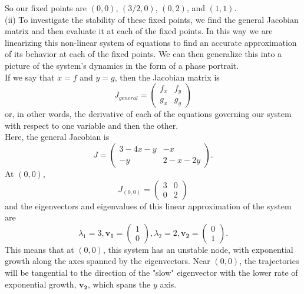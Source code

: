 \documentclass[11pt,answers]{exam}
\begin{document}
\begin{questions}
\begin{solution}
So our fixed points are $(0,0)$, $(3/2, 0)$, $(0,2)$, and $(1,1)$. \\
(ii) To investigate the stability of these fixed points, we find the general Jacobian matrix and then evaluate it at each of the fixed points. In this way we are linearizing this non-linear system of equations to find an accurate approximation of its behavior at each of the fixed points. We can then generalize this into a picture of the system's dynamics in the form of a phase portrait. \\
If we say that $\dot{x} = f$ and $\dot{y} = g$, then the Jacobian matrix is 
\begin{equation} J_{general} =
\begin{pmatrix}
f_{x} & f_{y}\\ 
g_{x} & g_{g}
\end{pmatrix}
\end{equation}
or, in other words, the derivative of each of the equations governing our system with respect to one variable and then the other. \\ 
Here, the general Jacobian is 
\begin{equation}J = 
\begin{pmatrix}
3-4x-y & -x\\ 
-y & 2-x-2y
\end{pmatrix}.
\end{equation}
At $(0,0)$,  
\begin{equation}J_{(0,0)} = 
\begin{pmatrix}
3 & 0\\ 
0 & 2
\end{pmatrix}
\end{equation}
and the eigenvectors and eigenvalues of this linear approximation of the system are
\begin{equation}
\lambda_{1} = 3, 
\mathbf{v_{1}} = \begin{pmatrix}
 1\\ 
 0
\end{pmatrix},
\lambda_{2} = 2,
\mathbf{v_{2}} = \begin{pmatrix}
 0\\ 
 1
\end{pmatrix}. 
\end{equation}
This means that at $(0,0)$, this system has an unstable node, with exponential growth along the axes spanned by the eigenvectors. Near $(0,0)$, the trajectories will be tangential to the direction of the "slow" eigenvector with the lower rate of exponential growth, $\mathbf{v_{2}}$, which spans the $y$ axis.  \\


\end{solution}
\end{questions}
\end{document}
